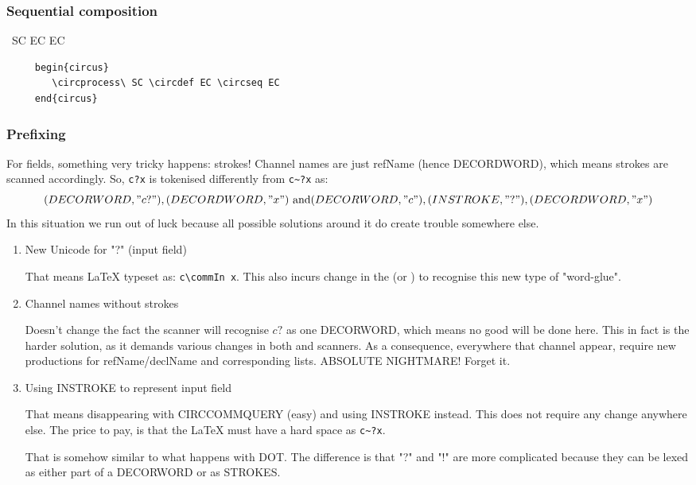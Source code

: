 \documentclass{article}
\begin{document}
\subsubsection{Sequential composition}

\begin{circus}
    \circprocess\ SC \circdef EC \circseq EC
\end{circus}
%
\begin{verbatim}
     begin{circus}
        \circprocess\ SC \circdef EC \circseq EC
     end{circus}
\end{verbatim}

\subsubsection{Prefixing}

For fields, something very tricky happens: strokes!
Channel names are just refName (hence DECORDWORD), which
means strokes are scanned accordingly.
So, \verb'c?x' is tokenised differently from \verb'c~?x' as:
\[
(DECORWORD, "c?"), (DECORDWORD, "x") \mbox{ and} \\
(DECORWORD, "c"), (INSTROKE, "?"), (DECORDWORD, "x")
\]
%
In this situation we run out of luck because all possible
solutions around it do create trouble somewhere else.

\begin{enumerate}
    \item New Unicode for "?" (input field)

    That means LaTeX typeset as: \verb'c\commIn x'.
    This also incurs change in the  (or )
    to recognise this new type of "word-glue".

    \item Channel names without strokes

    Doesn't change the fact the scanner will recognise $c?$ as
    one DECORWORD, which means no good will be done here.
    This in fact is the harder solution, as it demands various
    changes in both  and  scanners.
    As a consequence, everywhere that channel appear, require
    new productions for refName/declName and corresponding lists.
    ABSOLUTE NIGHTMARE! Forget it.

    \item Using INSTROKE to represent input field

    That means disappearing with CIRCCOMMQUERY (easy) and using
    INSTROKE instead. This does not require any change anywhere else.
    The price to pay, is that the LaTeX must have a hard space as \verb'c~?x'.

    That is somehow similar to what happens with DOT. The difference
    is that "?" and "!" are more complicated because they can be lexed
    as either part of a DECORWORD or as STROKES.


\end{enumerate}
\end{document}
